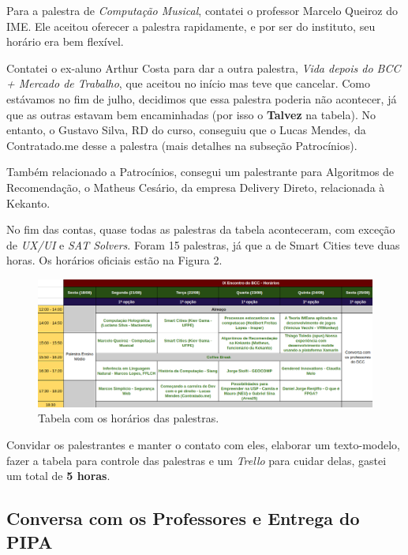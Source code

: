 \documentclass[12pt,letterpaper]{article}
\begin{document}
	Para a palestra de \textit{Computação Musical}, contatei o professor Marcelo Queiroz do IME. Ele aceitou oferecer a palestra rapidamente, e por ser do instituto, seu horário era bem flexível.
	
	Contatei o ex-aluno Arthur Costa para dar a outra palestra, \textit{Vida depois do BCC + Mercado de Trabalho}, que aceitou no início mas teve que cancelar. Como estávamos no fim de julho, decidimos que essa palestra poderia não acontecer, já que as outras estavam bem encaminhadas (por isso o \textbf{{\color{orange} Talvez}} na tabela). No entanto, o Gustavo Silva, RD do curso, conseguiu que o Lucas Mendes, da Contratado.me desse a palestra (mais detalhes na subseção Patrocínios).
	
	Também relacionado a Patrocínios, consegui um palestrante para Algoritmos de Recomendação, o Matheus Cesário, da empresa Delivery Direto, relacionada à Kekanto.
	
	No fim das contas, quase todas as palestras da tabela aconteceram, com exceção de \textit{UX/UI} e \textit{SAT Solvers}. Foram 15 palestras, já que a de Smart Cities teve duas horas. Os horários oficiais estão na Figura 2.
	
	\begin{figure}
		\begin{center}
			\includegraphics[scale=0.43]{horarios.png} 
			\caption{Tabela com os horários das palestras.}
		\end{center}
	\end{figure}

	Convidar os palestrantes e manter o contato com eles, elaborar um texto-modelo, fazer a tabela para controle das palestras e um \textit{Trello} para cuidar delas, gastei um total de \textbf{5 horas}. 
	
	\subsection{Conversa com os Professores e Entrega do PIPA}
	
\end{document}
